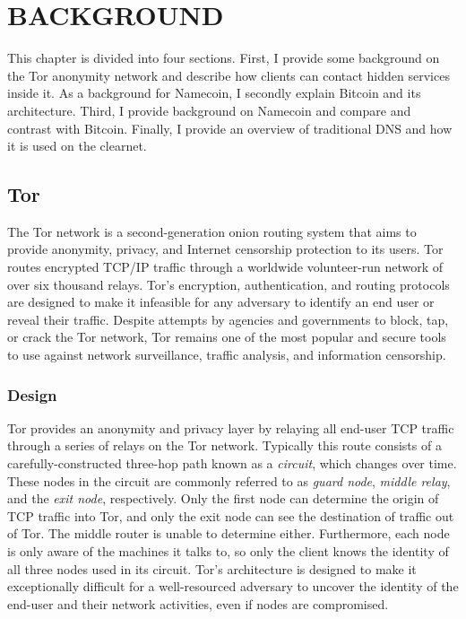 \chapter{\uppercase{BACKGROUND}}

This chapter is divided into four sections. First, I provide some background on the Tor anonymity network and describe how clients can contact hidden services inside it. As a background for Namecoin, I secondly explain Bitcoin and its architecture. Third, I provide background on Namecoin and compare and contrast with Bitcoin. Finally, I provide an overview of traditional DNS and how it is used on the clearnet.



\section{Tor}

The Tor network is a second-generation onion routing system that aims to provide anonymity, privacy, and Internet censorship protection to its users. Tor routes encrypted TCP/IP traffic through a worldwide volunteer-run network of over six thousand relays. Tor's encryption, authentication, and routing protocols are designed to make it infeasible for any adversary to identify an end user or reveal their traffic. Despite attempts by agencies and governments to block, tap, or crack the Tor network, Tor remains one of the most popular and secure tools to use against network surveillance, traffic analysis, and information censorship.

\subsection{Design}

Tor provides an anonymity and privacy layer by relaying all end-user TCP traffic through a series of relays on the Tor network. Typically this route consists of a carefully-constructed three-hop path known as a \textit{circuit}, which changes over time. These nodes in the circuit are commonly referred to as \textit{guard node}, \textit{middle relay}, and the \textit{exit node}, respectively. Only the first node can determine the origin of TCP traffic into Tor, and only the exit node can see the destination of traffic out of Tor. The middle router is unable to determine either. Furthermore, each node is only aware of the machines it talks to, so only the client knows the identity of all three nodes used in its circuit. Tor's architecture is designed to make it exceptionally difficult for a well-resourced adversary to uncover the identity of the end-user and their network activities, even if nodes are compromised.\cite{McCoy2008}

